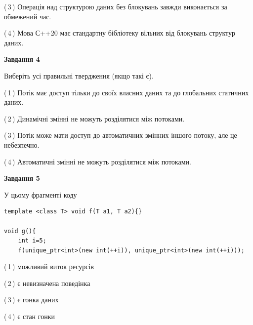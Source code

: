 \documentclass[12pt, ukrainian]{article}
\begin{document}
\begin {large}
{(\,3\,) Операція над структурою даних без блокувань завжди виконається за обмежений час.%

(\,4\,) Мова С++20 має стандартну бібліотеку вільних від блокувань структур даних.%



\begin{center}
\textbf{Завдання 4}
\end{center}
Виберіть усі правильні твердження (якщо такі є).\par
\vspace{2mm}

(\,1\,) Потік має доступ тільки до своїх власних даних та до глобальних статичних даних.%

(\,2\,) Динамічні змінні не можуть розділятися між потоками.%

(\,3\,) Потік може мати доступ до автоматичних змінних іншого потоку, але це небезпечно.%

(\,4\,) Автоматичні змінні не можуть розділятися між потоками.%



\begin{center}
\textbf{Завдання 5}
\end{center}
У цьому фрагменті коду
\begin{verbatim}
template <class T> void f(T a1, T a2){}

void g(){
    int i=5;
    f(unique_ptr<int>(new int(++i)), unique_ptr<int>(new int(++i)));
\end{verbatim}

(\,1\,) можливий виток ресурсів%

(\,2\,) є невизначена поведінка%

(\,3\,) є гонка даних%

(\,4\,) є стан гонки%


}
\end {large}
\end{document}
